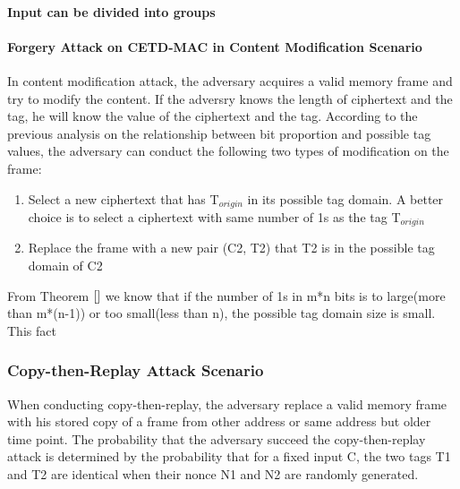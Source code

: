 \paragraph{Input can be divided into groups}
\paragraph{Forgery Attack on CETD-MAC in Content Modification Scenario}
In content modification attack, the adversary acquires a valid memory frame and try to modify the content. If the adversry knows the length of ciphertext and the tag, he will know the value of the ciphertext and the tag. According to the previous analysis on the relationship between bit proportion and possible tag values, the adversary can conduct the following two types of modification on the frame:
\begin{enumerate}
	\item Select a new ciphertext that has T$_{origin}$ in its possible tag domain. A better choice is to select a ciphertext with same number of 1s as the tag T$_{origin}$
	\item Replace the frame with a new pair (C2, T2) that T2 is in the possible tag domain of C2
\end{enumerate}
From Theorem $\ref{}$ we know that if the number of 1s in m*n bits is to large(more than m*(n-1)) or too small(less than n), the possible tag domain size is small. This fact 

\subsubsection{Copy-then-Replay Attack Scenario}
When conducting copy-then-replay, the adversary replace a valid memory frame with his stored copy of a frame from other address or same address but older time point. The probability that the adversary succeed the copy-then-replay attack is determined by the probability that for a fixed input C, the two tags T1 and T2 are identical when their nonce N1 and N2 are randomly generated.


